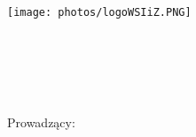 
\noindent
\parbox{65mm}{\texttt{[image: photos/logoWSIiZ.PNG]}}

\vspace{10mm}
\begin{center}
{\Large{}\textbf{\wydzial}}
\end{center}
\vspace{10mm}
\noindent
\hspace{30mm}{\Large{}\textbf{\kierunek}}\\

\noindent
\hspace{30mm}{\Large{}\textbf{\specjalnosc}}
\vspace{30mm}
\begin{center}
	{\large{}\autor}\\
	{\large{}\album}\\
	\vspace{15pt}
	{\huge{}\textbf{\textit{\temat}}}\\
	\vspace{20pt}
	{\normalsize{}Prowadzący: \promotor}\\
	\vspace{80pt}
	{\LARGE{}\textbf{\typpracy}}\\
	\vspace{150pt}
	{\large{}\textbf{\miasto {} \rok}}
\end{center}

\thispagestyle{empty}

\newpage



\tableofcontents
\thispagestyle{empty}
\newpage

